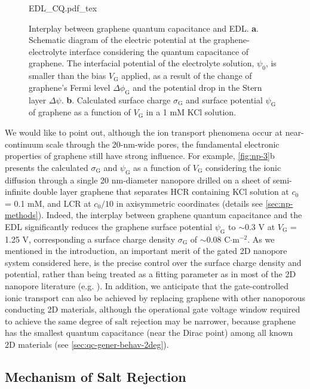 %
\begin{figure}[!htbp]
  \centering
  {EDL_CQ.pdf_tex}
  \caption{Interplay between graphene quantum capacitance and
    EDL. \textbf{a}. Schematic diagram of the electric potential at
    the graphene-electrolyte interface considering the quantum
    capacitance of graphene. The interfacial potential of the
    electrolyte solution, $\psi_{0}$, is smaller than the bias
    $V_{\mathrm{G}}$ applied, as a result of the change of graphene's
    Fermi level $\Delta \phi_{\mathrm{G}}$ and the potential drop in
    the Stern layer $\Delta \psi$. \textbf{b}. Calculated surface
    charge $\sigma_{\mathrm{G}}$ and surface potential
    $\psi_{\mathrm{G}}$ of graphene as a function of $V_{\mathrm{G}}$
    in a 1 mM KCl solution. }
  \label{fig:np-3}
\end{figure}
We would like to point out, although the ion transport phenomena occur
at near-continuum scale through the 20-nm-wide pores, the fundamental
electronic properties of graphene still have strong influence.
%
For
example, \autoref{fig:np-3}b presents the calculated
$\sigma_{\mathrm{G}}$ and $\psi_{\mathrm{G}}$ as a function of
$V_{\mathrm{G}}$ considering the ionic diffusion through a single 20
nm-diameter nanopore drilled on a sheet of semi-infinite double layer
graphene that separates HCR containing KCl solution at $c_{0}$ = 0.1
mM, and LCR at $c_{0}/10$ in axisymmetric coordinates (details see \autoref{sec:np-methods}). Indeed, the
interplay between graphene quantum capacitance and the EDL
significantly reduces the graphene surface potential
$\psi_{\mathrm{G}}$ to $\sim$0.3 V at $V_{\mathrm{G}}$ = 1.25 V,
corresponding a surface charge density $\sigma_{\mathrm{G}}$ of
$\sim$0.08 C$\cdot$m$^{-2}$.
As we mentioned in the introduction, an
important merit of the gated 2D nanopore system considered here,
is the precise control over the
surface charge density and potential,
rather than being treated as a fitting parameter as in most of the 2D
nanopore literature (e.g. \cite{Rollings_2016_gating}).
%
In addition, we anticipate that the gate-controlled ionic transport
can also be achieved by replacing graphene with other nanoporous
conducting 2D materials, although the operational gate voltage window
required to achieve the same degree of salt rejection may be narrower,
because graphene has the smallest quantum capacitance (near the Dirac
point) among all known 2D materials (see
\autoref{sec:qc-gener-behav-2deg}).

\subsection{Mechanism of Salt Rejection}
\label{sec:np-mechanism}

